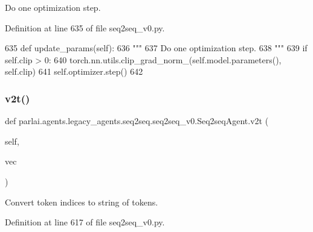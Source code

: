\begin{DoxyVerb}Do one optimization step.
\end{DoxyVerb}
 

Definition at line 635 of file seq2seq\+\_\+v0.\+py.


\begin{DoxyCode}
635     \textcolor{keyword}{def }update\_params(self):
636         \textcolor{stringliteral}{"""}
637 \textcolor{stringliteral}{        Do one optimization step.}
638 \textcolor{stringliteral}{        """}
639         \textcolor{keywordflow}{if} self.clip > 0:
640             torch.nn.utils.clip\_grad\_norm\_(self.model.parameters(), self.clip)
641         self.optimizer.step()
642 
\end{DoxyCode}
\mbox{\label{classparlai_1_1agents_1_1legacy__agents_1_1seq2seq_1_1seq2seq__v0_1_1Seq2seqAgent_a8f6de929b475d3915c159c48165b4575}} 
\subsubsection{\texorpdfstring{v2t()}{v2t()}}
{\footnotesize\ttfamily def parlai.\+agents.\+legacy\+\_\+agents.\+seq2seq.\+seq2seq\+\_\+v0.\+Seq2seq\+Agent.\+v2t (\begin{DoxyParamCaption}\item[{}]{self,  }\item[{}]{vec }\end{DoxyParamCaption})}

\begin{DoxyVerb}Convert token indices to string of tokens.
\end{DoxyVerb}
 

Definition at line 617 of file seq2seq\+\_\+v0.\+py.


